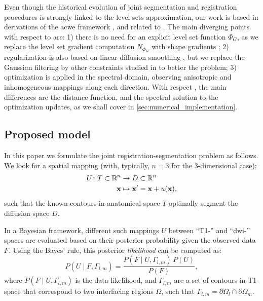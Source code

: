Even though the historical evolution
of joint segmentation and registration procedures is strongly linked
to the level sets approximation, our work is based in derivations of
the \gls{acwe} framework \citep{chan_active_2001}, and related to
\citep{le_guyader_combined_2011}.
{\color{red} {The main diverging points with respect to
\citep{gorthi_active_2011} are: 1) there is no need for an explicit level set function
$\Phi_G$, as we replace the level set gradient computation $N_{\Phi_G}$ with shape
gradients \citep{jehan-besson_dream2s:_2003,herbulot_segmentation_2006};
2) regularization is also based on linear diffusion smoothing \citep{thirion_image_1998},
but we replace the Gaussian filtering by other constraints
studied in \citep{nagel_investigation_1986} to better the problem;
3) optimization is applied in the spectral
domain, observing anisotropic and inhomogeneous mappings along each direction.
With respect \citep{le_guyader_combined_2011}, the main differences are
the distance function, and the spectral solution to the optimization updates,
as we shall cover in \autoref{sec:numerical_implementation}.}}



\subsection{Proposed model}
\label{sec:methods_map}
In this paper we formulate the joint registration-segmentation
problem as follows. We look for a spatial mapping (with, typically,
$n=3$ for the 3-dimensional case):
\begin{align}
U\colon T \subset \mathbb{R}^n &\to D \subset \mathbb{R}^n \notag\\
\vec{x} &\mapsto \vec{x}' =\vec{x}+u(\vec{x}),
\label{eq:deformation_field}
\end{align}
such that the known contours in anatomical space $T$ optimally segment
the diffusion space $D$.

In a Bayesian framework, different such mappings $U$ between ``T1-''
and ``\gls*{dwi}-'' spaces are evaluated based on their posterior
probability given the observed data $F$. Using the Bayes' rule, this
posterior \emph{likelihood} can be computed as:
\begin{equation}
P(U \mid F,\Gamma_{l,m}) = \frac{P(F \mid U,\Gamma_{l,m})\, P(U)}{P(F)},
\label{eq:bayes_rule}
\end{equation}
where $P(F \mid U,\Gamma_{l,m})$ is the data-likelihood, and
$\Gamma_{l,m}$ are a set of contours in T1-space that correspond to
two interfacing regions $\Omega$, such that 
$\Gamma_{l,m} = \partial \Omega_l \cap \partial \Omega_m$.

